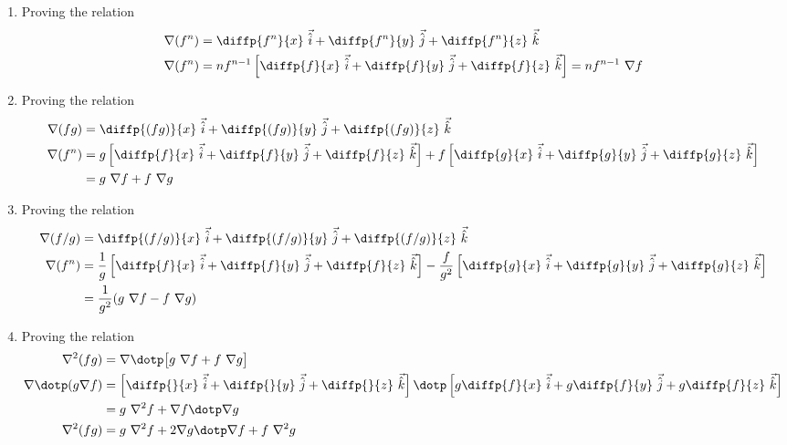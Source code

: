 \begin{enumerate}
    \item Proving the relation
          \begin{align}
              \nabla (f^n) & = \diffp{f^n}{x}\ \vec{\hat{i}}
              + \diffp{f^n}{y}\ \vec{\hat{j}} + \diffp{f^n}{z}\ \vec{\hat{k}} \\
              \nabla (f^n) & = nf^{n-1} \left[ \diffp{f}{x}\ \vec{\hat{i}}
                  + \diffp{f}{y}\ \vec{\hat{j}} + \diffp{f}{z}\ \vec{\hat{k}} \right]
              = nf^{n-1}\ \nabla f
          \end{align}

    \item Proving the relation
          \begin{align}
              \nabla (fg)  & = \diffp{(fg)}{x}\ \vec{\hat{i}}
              + \diffp{(fg)}{y}\ \vec{\hat{j}} + \diffp{(fg)}{z}\ \vec{\hat{k}}   \\
              \nabla (f^n) & = g \left[ \diffp{f}{x}\ \vec{\hat{i}}
                  + \diffp{f}{y}\ \vec{\hat{j}} + \diffp{f}{z}\ \vec{\hat{k}} \right]
              + f \left[ \diffp{g}{x}\ \vec{\hat{i}}
              + \diffp{g}{y}\ \vec{\hat{j}} + \diffp{g}{z}\ \vec{\hat{k}} \right] \\
                           & = g\ \nabla f + f\ \nabla g
          \end{align}

    \item Proving the relation
          \begin{align}
              \nabla (f/g) & = \diffp{(f/g)}{x}\ \vec{\hat{i}}
              + \diffp{(f/g)}{y}\ \vec{\hat{j}} + \diffp{(f/g)}{z}\ \vec{\hat{k}} \\
              \nabla (f^n) & = \frac{1}{g} \left[ \diffp{f}{x}\ \vec{\hat{i}}
                  + \diffp{f}{y}\ \vec{\hat{j}} + \diffp{f}{z}\ \vec{\hat{k}} \right]
              - \frac{f}{g^2} \left[ \diffp{g}{x}\ \vec{\hat{i}}
              + \diffp{g}{y}\ \vec{\hat{j}} + \diffp{g}{z}\ \vec{\hat{k}} \right] \\
                           & = \frac{1}{g^2}(g\ \nabla f - f\ \nabla g)
          \end{align}

    \item Proving the relation
          \begin{align}
              \nabla^2 (fg)            & = \nabla \dotp \big[ g\ \nabla f
              + f\ \nabla g \big]                                                    \\
              \nabla \dotp (g\nabla f) & = \left[ \diffp{}{x}\ \vec{\hat{i}}
                  + \diffp{}{y}\ \vec{\hat{j}} + \diffp{}{z}\ \vec{\hat{k}} \right]
              \dotp \left[ g\diffp{f}{x}\ \vec{\hat{i}}
              + g\diffp{f}{y}\ \vec{\hat{j}} + g\diffp{f}{z}\ \vec{\hat{k}} \right]  \\
                                       & =g\ \nabla^2 f + \nabla f \dotp \nabla g    \\
              \nabla^2 (fg)            & = g\ \nabla^2 f + 2 \nabla g \dotp \nabla f
              + f\ \nabla^2 g
          \end{align}


\end{enumerate}
